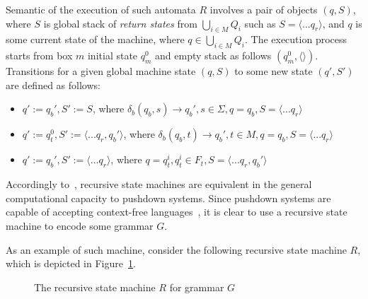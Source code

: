 Semantic of the execution of such automata $R$ involves a pair of objects $(q,S)$, where $S$ is global stack of \textit{return states} from $\bigcup_{i \in M}Q_i$ such as $S=\langle ...q_r \rangle$, and $q$ is some current state of the machine, where $q \in \bigcup_{i \in M}Q_i$. The execution process starts from box $m$ initial state $q_m^0$ and empty stack as follows $(q_m^0,\langle \rangle)$. Transitions for a given global machine state $(q,S)$ to some new state $(q',S')$ are defined as follows:

\begin{itemize}
    \item $q':=q_b', S':=S$, 
    where $\delta_b (q_b,s) \to q_b', s \in \Sigma, 
    q=q_b, S = \langle ...q_r \rangle$
    \item $q':=q_t^0, S':=\langle ...q_r,q_b'\rangle$, 
    where $\delta_b (q_b,t) \to q_b', t \in M, q=q_b, S = \langle ...q_r \rangle$
    \item $q':=q_b', S':=\langle ...q_r \rangle$, 
    where $q=q_t^i, q_t^i \in F_t, S=\langle ...q_r,q_b' \rangle$
\end{itemize}

Accordingly to~\cite{rsm:analysis:10.1007/3-540-44585-4_18}, recursive state machines are equivalent in the general computational capacity to pushdown systems. Since pushdown systems are capable of accepting context-free languages~\cite{automata:theory:10.5555/1177300}, it is clear to use a recursive state machine to encode some grammar $G$. 

As an example of such machine, consider the following recursive state machine $R$, which is depicted in Figure~\ref{example:automata}.

\begin{figure}[h]
    \centering
    \caption{The recursive state machine $R$ for grammar $G$}
    \label{example:automata}
\end{figure}


